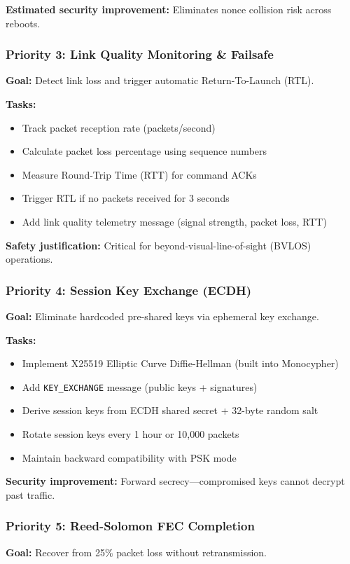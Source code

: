 \documentclass[11pt,a4paper]{article}
\begin{document}
\textbf{Estimated security improvement:} Eliminates nonce collision risk across reboots.

\subsubsection{Priority 3: Link Quality Monitoring \& Failsafe}
\textbf{Goal:} Detect link loss and trigger automatic Return-To-Launch (RTL).

\textbf{Tasks:}
\begin{itemize}[noitemsep]
    \item Track packet reception rate (packets/second)
    \item Calculate packet loss percentage using sequence numbers
    \item Measure Round-Trip Time (RTT) for command ACKs
    \item Trigger RTL if no packets received for 3 seconds
    \item Add link quality telemetry message (signal strength, packet loss, RTT)
\end{itemize}

\textbf{Safety justification:} Critical for beyond-visual-line-of-sight (BVLOS) operations.

\subsubsection{Priority 4: Session Key Exchange (ECDH)}
\textbf{Goal:} Eliminate hardcoded pre-shared keys via ephemeral key exchange.

\textbf{Tasks:}
\begin{itemize}[noitemsep]
    \item Implement X25519 Elliptic Curve Diffie-Hellman (built into Monocypher)
    \item Add \texttt{KEY\_EXCHANGE} message (public keys + signatures)
    \item Derive session keys from ECDH shared secret + 32-byte random salt
    \item Rotate session keys every 1 hour or 10{,}000 packets
    \item Maintain backward compatibility with PSK mode
\end{itemize}

\textbf{Security improvement:} Forward secrecy---compromised keys cannot decrypt past traffic.

\subsubsection{Priority 5: Reed-Solomon FEC Completion}
\textbf{Goal:} Recover from 25\% packet loss without retransmission.
\end{document}
